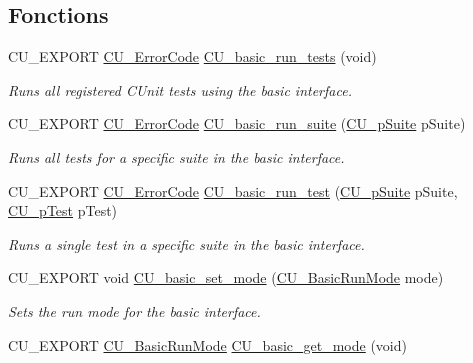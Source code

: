 \subsection*{Fonctions}
\begin{DoxyCompactItemize}
\item 
C\-U\-\_\-\-E\-X\-P\-O\-R\-T \hyperlink{group__Framework_ga743a2a025ee3eb792d7d85f0eea347e6}{C\-U\-\_\-\-Error\-Code} \hyperlink{group__Basic_gab8e9092071a6d97666451c1ea5cc4753}{C\-U\-\_\-basic\-\_\-run\-\_\-tests} (void)
\begin{DoxyCompactList}\small\item\em Runs all registered C\-Unit tests using the basic interface. \end{DoxyCompactList}\item 
C\-U\-\_\-\-E\-X\-P\-O\-R\-T \hyperlink{group__Framework_ga743a2a025ee3eb792d7d85f0eea347e6}{C\-U\-\_\-\-Error\-Code} \hyperlink{group__Basic_gad759648660e050dc43e31477ef2bf9e3}{C\-U\-\_\-basic\-\_\-run\-\_\-suite} (\hyperlink{group__Framework_gaba832ae8b235f5e70d6a4ac9c3bb1219}{C\-U\-\_\-p\-Suite} p\-Suite)
\begin{DoxyCompactList}\small\item\em Runs all tests for a specific suite in the basic interface. \end{DoxyCompactList}\item 
C\-U\-\_\-\-E\-X\-P\-O\-R\-T \hyperlink{group__Framework_ga743a2a025ee3eb792d7d85f0eea347e6}{C\-U\-\_\-\-Error\-Code} \hyperlink{group__Basic_ga201394cc25e1f711c105652cf9a9eda8}{C\-U\-\_\-basic\-\_\-run\-\_\-test} (\hyperlink{group__Framework_gaba832ae8b235f5e70d6a4ac9c3bb1219}{C\-U\-\_\-p\-Suite} p\-Suite, \hyperlink{group__Framework_ga249c43fbe4e53452b3f90db1437da04b}{C\-U\-\_\-p\-Test} p\-Test)
\begin{DoxyCompactList}\small\item\em Runs a single test in a specific suite in the basic interface. \end{DoxyCompactList}\item 
C\-U\-\_\-\-E\-X\-P\-O\-R\-T void \hyperlink{group__Basic_ga4a816b2dbd39aef96875a561e43026be}{C\-U\-\_\-basic\-\_\-set\-\_\-mode} (\hyperlink{group__Basic_ga2f7ec57f8b59cfef5c5600bafa4865a6}{C\-U\-\_\-\-Basic\-Run\-Mode} mode)
\begin{DoxyCompactList}\small\item\em Sets the run mode for the basic interface. \end{DoxyCompactList}\item 
C\-U\-\_\-\-E\-X\-P\-O\-R\-T \hyperlink{group__Basic_ga2f7ec57f8b59cfef5c5600bafa4865a6}{C\-U\-\_\-\-Basic\-Run\-Mode} \hyperlink{group__Basic_ga10cca27673fb32e100b27d72b9868956}{C\-U\-\_\-basic\-\_\-get\-\_\-mode} (void)

\end{DoxyCompactItemize}
